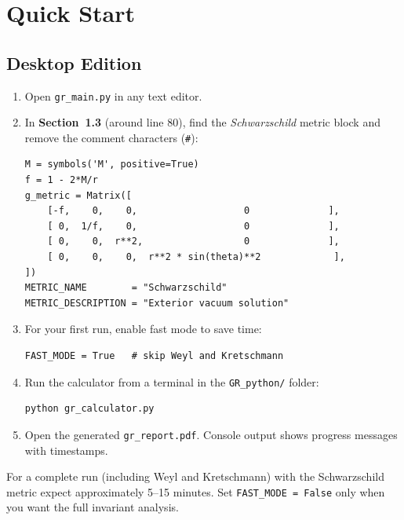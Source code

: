\documentclass[11pt,a4paper]{article}
\newcommand{\code}[1]{\texttt{\small#1}}
\begin{document}
\section{Quick Start}
\label{sec:quickstart}

\subsection{Desktop Edition}

\begin{enumerate}
  \item Open \code{gr\_main.py} in any text editor.
  \item In \textbf{Section~1.3} (around line 80), find the
        \emph{Schwarzschild} metric block and remove the comment characters
        (\code{\#}):
\begin{lstlisting}
M = symbols('M', positive=True)
f = 1 - 2*M/r
g_metric = Matrix([
    [-f,    0,    0,                   0              ],
    [ 0,  1/f,    0,                   0              ],
    [ 0,    0,  r**2,                  0              ],
    [ 0,    0,    0,  r**2 * sin(theta)**2             ],
])
METRIC_NAME        = "Schwarzschild"
METRIC_DESCRIPTION = "Exterior vacuum solution"
\end{lstlisting}
  \item For your first run, enable fast mode to save time:
\begin{lstlisting}
FAST_MODE = True   # skip Weyl and Kretschmann
\end{lstlisting}
  \item Run the calculator from a terminal in the \code{GR\_python/} folder:
\begin{lstlisting}[language=bash,numbers=none]
python gr_calculator.py
\end{lstlisting}
  \item Open the generated \code{gr\_report.pdf}.  Console output shows
        progress messages with timestamps.
\end{enumerate}

\begin{tipbox}
  For a complete run (including Weyl and Kretschmann) with the Schwarzschild
  metric expect approximately 5--15 minutes.  Set \code{FAST\_MODE = False}
  only when you want the full invariant analysis.
\end{tipbox}
\end{document}
